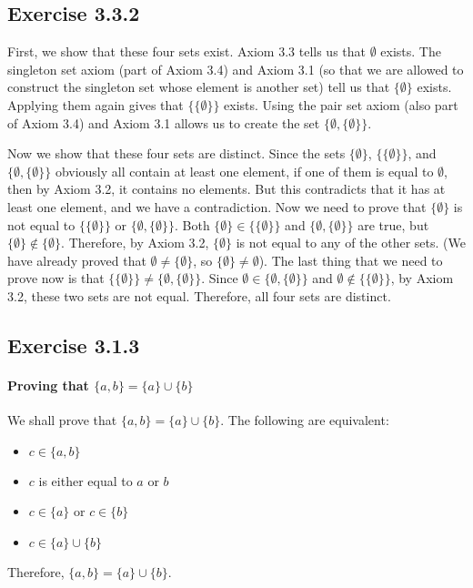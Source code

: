 \documentclass[12pt, oneside]{book}
\begin{document}
	\subsection*{Exercise 3.3.2}

	First, we show that these four sets exist. Axiom 3.3 tells us that $\emptyset$ exists. The singleton set axiom (part of Axiom 3.4) and Axiom 3.1 (so that we are allowed to construct the singleton set whose element is another set) tell us that $\{\emptyset\}$ exists. Applying them again gives that $\{\{\emptyset\}\}$ exists. Using the pair set axiom (also part of Axiom 3.4) and Axiom 3.1 allows us to create the set $\{\emptyset, \{\emptyset\}\}$.

	Now we show that these four sets are distinct. Since the sets $\{\emptyset\}$, $\{\{\emptyset\}\}$, and $\{\emptyset, \{\emptyset\}\}$ obviously all contain at least one element, if one of them is equal to $\emptyset$, then by Axiom 3.2, it contains no elements. But this contradicts that it has at least one element, and we have a contradiction. Now we need to prove that $\{\emptyset\}$ is not equal to $\{\{\emptyset\}\}$ or $\{\emptyset, \{\emptyset\}\}$. Both $\{\emptyset\} \in \{\{\emptyset\}\}$ and $\{\emptyset, \{\emptyset\}\}$ are true, but $\{\emptyset\} \notin \{\emptyset\}$. Therefore, by Axiom 3.2, $\{\emptyset\}$ is not equal to any of the other sets. (We have already proved that $\emptyset \ne \{\emptyset\}$, so $\{\emptyset\} \ne \emptyset$). The last thing that we need to prove now is that $\{\{\emptyset\}\} \ne \{\emptyset, \{\emptyset\}\}$. Since $\emptyset \in \{\emptyset, \{\emptyset\}\}$ and $\emptyset \notin \{\{\emptyset\}\}$, by Axiom 3.2, these two sets are not equal. Therefore, all four sets are distinct.

	\subsection*{Exercise 3.1.3}

	\paragraph*{Proving that $\{a, b\} = \{a\} \cup \{b\}$}

	We shall prove that $\{a, b\} = \{a\} \cup \{b\}$. The following are equivalent:
	\begin{itemize}
		\item $c \in \{a, b\}$
		\item $c$ is either equal to $a$ or $b$
		\item $c \in \{a\}$ or $c \in \{b\}$
		\item $c \in \{a\} \cup \{b\}$
	\end{itemize}
	Therefore, $\{a, b\} = \{a\} \cup \{b\}$.
\end{document}
